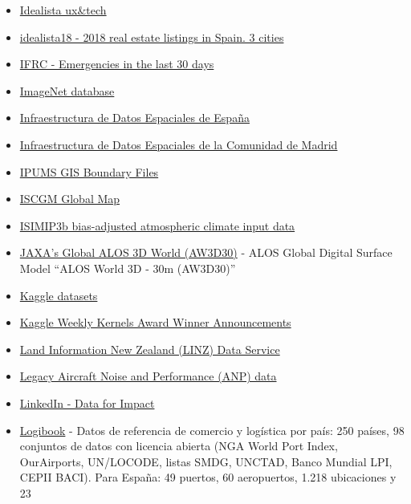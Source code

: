 \documentclass[
  letterpaper,
  DIV=11,
  numbers=noendperiod]{scrartcl}
\begin{document}
\begin{itemize}
{  Over 50 Tanager Radiance Datasets}
\item
  \href{https://www.idealista.com/labs/blog/}{Idealista ux\&tech}
\item
  \href{https://github.com/paezha/idealista18}{idealista18 - 2018 real
  estate listings in Spain. 3 cities}
\item
  \href{https://go.ifrc.org/emergencies}{IFRC - Emergencies in the last
  30 days}
\item
  \href{http://www.image-net.org/}{ImageNet database}
\item
  \href{https://idee.es/web/idee/inicio}{Infraestructura de Datos
  Espaciales de España}
\item
  \href{http://www.madrid.org/cartografia/idem/html/web/index.htm}{Infraestructura
  de Datos Espaciales de la Comunidad de Madrid}
\item
  \href{https://international.ipums.org/international/gis.shtml}{IPUMS
  GIS Boundary Files}
\item
  \href{https://globalmaps.github.io/}{ISCGM Global Map}
\item
  \href{https://data.isimip.org/datasets/24cb1007-3c96-4b59-a0dc-42d94a8cff8c/}{ISIMIP3b
  bias-adjusted atmospheric climate input data}
\item
  \href{https://www.eorc.jaxa.jp/ALOS/en/dataset/aw3d30/aw3d30_e.htm}{JAXA's
  Global ALOS 3D World (AW3D30)} - ALOS Global Digital Surface Model
  ``ALOS World 3D - 30m (AW3D30)''
\item
  \href{https://www.kaggle.com/datasets}{Kaggle datasets}
\item
  \href{https://www.kaggle.com/general/37924\#post354114}{Kaggle Weekly
  Kernels Award Winner Announcements}
\item
  \href{https://data.linz.govt.nz/}{Land Information New Zealand (LINZ)
  Data Service}
\item
  \href{https://www.easa.europa.eu/en/domains/environment/policy-support-and-research/aircraft-noise-and-performance-anp-data/anp-legacy-data}{Legacy
  Aircraft Noise and Performance (ANP) data}
\item
  \href{https://economicgraph.linkedin.com/data-for-impact}{LinkedIn -
  Data for Impact}
\item
  \href{https://logibook.dataint.net/es/paises/espana}{Logibook} - Datos
  de referencia de comercio y logística por país: 250 países, 98
  conjuntos de datos con licencia abierta (NGA World Port Index,
  OurAirports, UN/LOCODE, listas SMDG, UNCTAD, Banco Mundial LPI, CEPII
  BACI). Para España: 49 puertos, 60 aeropuertos, 1.218 ubicaciones y 23

\end{itemize}
\end{document}
